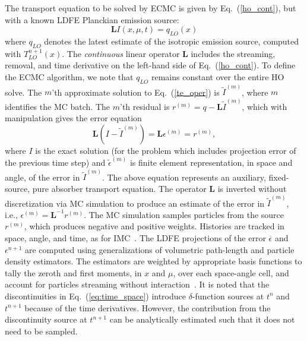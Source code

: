 \documentclass{anstrans}
\renewcommand{\eqref}[1]{(\ref{#1})}
\newcommand{\B}[1]{\ensuremath{\mathbf{#1}}}
\begin{document}
The transport equation to be solved by ECMC is given by Eq.~\eqref{ho_cont}, but with a
known LDFE Planckian emission source:
\begin{equation}\label{te_oper}
    \B L I(x,\mu,t)  = q_{LO}(x)
\end{equation}
where $q_{LO}$ denotes the latest estimate of the isotropic emission source, computed with $T_{LO}^{n+1}(x)$.  The \emph{continuous} linear operator $\B L$ includes the streaming, removal, and
time derivative on the left-hand side of Eq.~\eqref{ho_cont}.  
To define the ECMC algorithm, we note that $q_{LO}$ remains constant over the entire HO solve.
The $m$'th approximate solution to Eq.~\eqref{te_oper} is $\tilde{I}^{(m)}$, where
$m$ identifies the MC batch.
The $m$'th residual is $r^{(m)} = q - \B L\tilde{I}^{(m)}$, which with manipulation gives the error equation
\begin{equation}
\B L (I - \tilde{I}^{(m)}) = \B L {\epsilon}^{(m)} = r^{(m)},
\end{equation}
where $I$ is the exact solution (for the problem which includes projection error of the
previous time step) and $\tilde{\epsilon}^{(m)}$ is finite element
representation, in space and angle, of the error in
$\tilde{I}^{(m)}$. The above equation represents an auxiliary, fixed-source, pure
absorber transport equation.
The operator $\B L$ is inverted without discretization via MC simulation to produce an
estimate of the error in $\tilde{I}^{(m)}$, i.e., ${\epsilon}^{(m)} = \B
L^{-1} r^{(m)}$.  The MC simulation samples particles from the source $r^{(m)}$, which
produces negative and positive weights.  Histories are tracked in space, angle, and time, as for IMC~\cite{fnc}.
The LDFE projections of the error $\overline{\epsilon}$ and $\epsilon^{n+1}$ are computed using
generalizations of volumetric path-length and particle density
estimators.  The estimators are weighted by appropriate basis
functions to tally the zeroth and first moments, in $x$ and $\mu$, over each
space-angle cell, and account for particles streaming without interaction~\cite{bolding_nse}.
It is noted that the discontinuities in Eq.~\eqref{eq:time_space} introduce $\delta$-function sources at $t^{n}$ and $t^{n+1}$
because of the time derivatives.
However, the contribution from the discontinuity source at $t^{n+1}$ can be analytically
estimated such that it does not need to be sampled.
\end{document}
